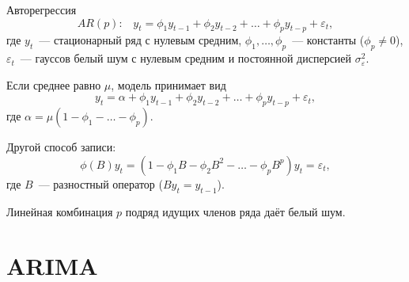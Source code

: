 \documentclass[9pt,pdf,utf8,hyperref={unicode},aspectratio=169]{beamer}
\begin{document}
\begin{frame}{Авторегрессия}
    $$AR(p)\colon \;\;\; y_t = \phi_1 y_{t-1} + \phi_2 y_{t-2} + \dots + \phi_p y_{t-p} + \varepsilon_t,$$
    где $y_t$~--- стационарный ряд с нулевым средним, $\phi_1,\dots,\phi_p$~--- константы ($\phi_p \neq 0$), $\varepsilon_t$~--- гауссов белый шум с нулевым средним и постоянной дисперсией $\sigma_\varepsilon^2.$

    \bigskip

    Если среднее равно $\mu$, модель принимает вид
    $$y_t = \alpha + \phi_1y_{t-1} + \phi_2 y_{t-2} + \dots + \phi_p y_{t-p} + \varepsilon_t,$$
    где $\alpha=\mu\left(1-\phi_1-\dots-\phi_p\right).$

    \bigskip

    Другой способ записи:
    $$\phi\left(B\right)y_t = \left(1-\phi_1B - \phi_2B^2 - \dots - \phi_pB^p\right)y_t = \varepsilon_t,$$
    где $B$~--- разностный оператор ($By_t = y_{t-1}$).

    \bigskip

    Линейная комбинация $p$ подряд идущих членов ряда даёт белый шум.
%	
\end{frame}

\section{ARIMA}
\end{document}
